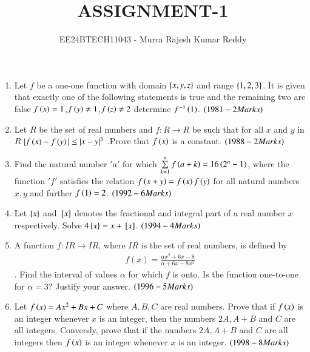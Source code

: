 \documentclass[journal,12pt,twocolumn,article]{IEEEtran}
\theoremstyle{remark}
\begin{document}

\vspace{4cm}
\title{ASSIGNMENT-1}
\author{EE24BTECH11043 - Murra Rajesh Kumar Reddy}
\maketitle
\bigskip
\begin{enumerate}[start=6]
	\item Let $f$ be a one-one function with domain $\left\{x,y,z\right\}$ and range $\left\{1,2,3\right\}$. It is given that exactly one of the following statements is true and the remaining two are false ${f\left(x\right)=1}$,${f\left(y\right)\neq1}$,$f\left(z\right)\neq2$ determine $f^{-1}\left(1\right)$. \hfill$\left(1981 - 2 Marks\right)$
	\item Let $R$ be the set of real numbers and $f:R \to R$ be such that for all $x$ and $y$ in $R$ ${|f\left(x\right)-f\left(y\right)| \le |x-y|^3}$ .Prove that $f\left(x\right)$ is a constant. \hfill$\left(1988 - 2 Marks\right)$
	\item Find the natural number $'a'$ for which ${\sum\limits_{k=1}^nf\left(a+k\right)=16\left(2^n -1\right)}$, where the function $'f'$ satisfies the relation ${f\left(x+y\right)=f\left(x\right)f\left(y\right)}$ for all natural numbers $x, y$ and further ${f\left(1\right)=2}$. \hfill${\left(1992- 6 Marks\right)}$
	\item Let $\left\{x\right\}$ and ${}\left[x\right]$ denotes the fractional and integral part of a real number $x$ respectively. Solve $4\left\{x\right\}=x+{}\left[x\right]$. \hfill$\left(1994- 4 Marks\right)$
	\item A function $f:IR\to IR$, where $IR$ is the set of real numbers, is defined by
		\begin{align*}
			{f(x)=\frac{\alpha x^2 +6x -8}{\alpha +6x-8x^2}}
		\end{align*}
		. Find the interval of values $\alpha$ for which $f$ is onto. Is the function one-to-one for $\alpha=3$? Justify your answer. \hfill${\left(1996- 5 Marks\right)}$
	\item Let ${f\left(x\right)=Ax^2+Bx+C}$ where $A,B,C$ are real numbers. Prove that if $f\left(x\right)$ is an integer whenever $x$ is an integer, then the numbers $2A, A+B$ and $C$ are all integers. Conversly, prove that if the numbers $2A, A+B$ and $C$ are all integers then $f\left(x\right)$ is an integer whenever $x$ is an integer. \hfill${\left(1998- 8 Marks\right)}$ 
\end{enumerate}
	\onecolumn
\end{document}
